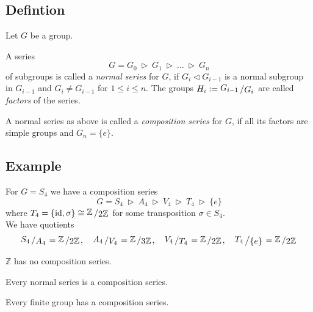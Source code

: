 \documentclass[12pt]{book}
\newcommand{\slant}[2]{{\raisebox{.1em}{$#1$}\left/\raisebox{-.1em}{$#2$}\right.}}
\begin{document}
\begin{spacing}{1.3}
\subsection{Defintion} %
Let $G$ be a group.
\begin{compactenum}
\item A series $$G=G_0 \ \triangleright \ G_1 \ \triangleright \ \ldots \ \triangleright \ G_n$$
of subgroups is called a \textit{normal series} for $G$, if $G_{i}\triangleleft G_{i-1}$ is a normal subgroup in $G_{i-1}$ and $G_{i}\neq G_{i-1}$ for $1 \leqslant i \leqslant n$. The groups $H_i:=\slant{G_{i-1}}{G_i}$ are called \textit{factors} of the series.
\item A normal series as above is called a \textit{composition series} for $G$, if all its factors are simple groups and $G_n=\{e\}$.
\end{compactenum}

\subsection*{Example} %
\titleformat{\subsection}{\normalfont\normalsize\bfseries}{}{0em}{#1 \thesubsection}
\begin{compactenum}
\item For $G=S_4$ we have a composition series
$$G=S_4 \ \triangleright \ A_4 \ \triangleright \ V_4 \ \triangleright \ T_4 \ \triangleright \ \{e\}$$
where $T_4=\{\textrm{id}, \sigma\} \cong \slant{\mathbb{Z}}{2 \mathbb{Z}}$ for some transposition $\sigma \in S_4$. \\
We have quotients
$$\slant{S_4}{A_4}=\slant{\mathbb{Z}}{2 \mathbb{Z}}, \quad \slant{A_4}{V_4}=\slant{\mathbb{Z}}{3 \mathbb{Z}}, \quad \slant{V_4}{T_4}=\slant{\mathbb{Z}}{2 \mathbb{Z}}, \quad \slant{T_4}{\{e\}}=\slant{\mathbb{Z}}{2 \mathbb{Z}}$$
\item $\mathbb{Z}$ has no composition series.
\item Every normal series is a composition series.
\item Every finite group has a composition series.
\end{compactenum}


\end{spacing}
\end{document}
